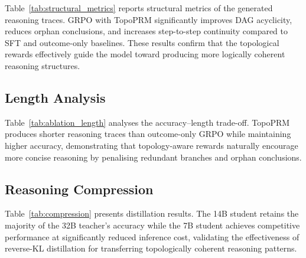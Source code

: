 

Table~\ref{tab:structural_metrics} reports structural metrics of the
generated reasoning traces. GRPO with TopoPRM significantly improves
DAG acyclicity, reduces orphan conclusions, and increases step-to-step
continuity compared to SFT and outcome-only baselines. These results
confirm that the topological rewards effectively guide the model toward
producing more logically coherent reasoning structures.

\subsection{Length Analysis}
\label{sec:length_analysis}



Table~\ref{tab:ablation_length} analyses the accuracy--length trade-off.
TopoPRM produces shorter reasoning traces than outcome-only GRPO while
maintaining higher accuracy, demonstrating that topology-aware rewards
naturally encourage more concise reasoning by penalising redundant
branches and orphan conclusions.

\subsection{Reasoning Compression}
\label{sec:compression_results}



Table~\ref{tab:compression} presents distillation results. The 14B
student retains the majority of the 32B teacher's accuracy while the 7B
student achieves competitive performance at significantly reduced
inference cost, validating the effectiveness of reverse-KL distillation
for transferring topologically coherent reasoning patterns.
